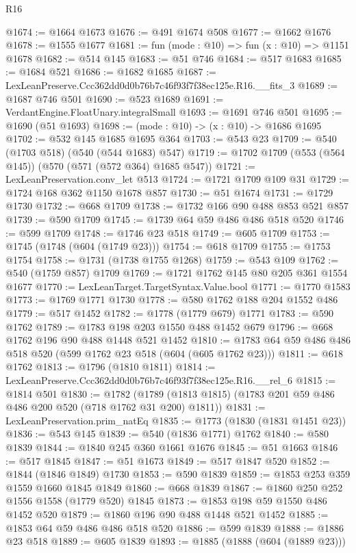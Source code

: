 \begin{lexlean}{R16}
\begin{coremodule}
@1674 := @1664 @1673
@1676 := @491 @1674 @508
@1677 := @1662 @1676
@1678 := @1555 @1677
@1681 := fun (mode : @10) => fun (x : @10) => @1151 @1678
@1682 := @514 @145
@1683 := @51 @746
@1684 := @517 @1683
@1685 := @1684 @521
@1686 := @1682 @1685
@1687 := LexLeanPreserve.Ccc362dd0d0b76b7c46f93f7f38ec125e.R16.__fits_3
@1689 := @1687 @746 @501
@1690 := @523 @1689
@1691 := VerdantEngine.FloatUnary.integralSmall
@1693 := @1691 @746 @501
@1695 := @1690 (@51 @1693)
@1698 := (mode : @10) -> (x : @10) -> @1686 @1695
@1702 := @532 @145 @1685 @1695 @364
@1703 := @543 @23
@1709 := @540 (@1703 @518) (@540 (@544 @1683) @547)
@1719 := @1702 @1709 (@553 (@564 @145)) (@570 (@571 (@572 @364) @1685 @547))
@1721 := LexLeanPreservation.conv_let @513
@1724 := @1721 @1709 @109 @31
@1729 := @1724 @168 @362 @1150 @1678 @857
@1730 := @51 @1674
@1731 := @1729 @1730
@1732 := @668 @1709
@1738 := @1732 @166 @90 @488 @853 @521 @857
@1739 := @590 @1709
@1745 := @1739 @64 @59 @486 @486 @518 @520
@1746 := @599 @1709
@1748 := @1746 @23 @518
@1749 := @605 @1709
@1753 := @1745 (@1748 (@604 (@1749 @23)))
@1754 := @618 @1709
@1755 := @1753 @1754
@1758 := @1731 (@1738 @1755 @1268)
@1759 := @543 @109
@1762 := @540 (@1759 @857) @1709
@1769 := @1721 @1762 @145 @80 @205 @361 @1554 @1677
@1770 := LexLeanTarget.TargetSyntax.Value.bool
@1771 := @1770 @1583
@1773 := @1769 @1771 @1730
@1778 := @580 @1762 @188 @204 @1552 @486
@1779 := @517 @1452
@1782 := @1778 (@1779 @679) @1771
@1783 := @590 @1762
@1789 := @1783 @198 @203 @1550 @488 @1452 @679
@1796 := @668 @1762 @196 @90 @488 @1448 @521 @1452
@1810 := @1783 @64 @59 @486 @486 @518 @520 (@599 @1762 @23 @518 (@604 (@605 @1762 @23)))
@1811 := @618 @1762
@1813 := @1796 (@1810 @1811)
@1814 := LexLeanPreserve.Ccc362dd0d0b76b7c46f93f7f38ec125e.R16.__rel_6
@1815 := @1814 @501
@1830 := @1782
    (@1789 (@1813 @1815) (@1783 @201 @59 @486 @486 @200 @520 (@718 @1762 @31 @200) @1811))
@1831 := LexLeanPreservation.prim_natEq
@1835 := @1773 (@1830 (@1831 @1451 @23))
@1836 := @543 @145
@1839 := @540 (@1836 @1771) @1762
@1840 := @580 @1839
@1844 := @1840 @245 @360 @1661 @1676
@1845 := @51 @1663
@1846 := @517 @1845
@1847 := @51 @1673
@1849 := @517 @1847 @520
@1852 := @1844 (@1846 @1849) @1730
@1853 := @590 @1839
@1859 := @1853 @253 @359 @1559 @1660 @1845 @1849
@1860 := @668 @1839
@1867 := @1860 @250 @252 @1556 @1558 (@1779 @520) @1845
@1873 := @1853 @198 @59 @1550 @486 @1452 @520
@1879 := @1860 @196 @90 @488 @1448 @521 @1452
@1885 := @1853 @64 @59 @486 @486 @518 @520
@1886 := @599 @1839
@1888 := @1886 @23 @518
@1889 := @605 @1839
@1893 := @1885 (@1888 (@604 (@1889 @23)))

\end{coremodule}
\end{lexlean}
